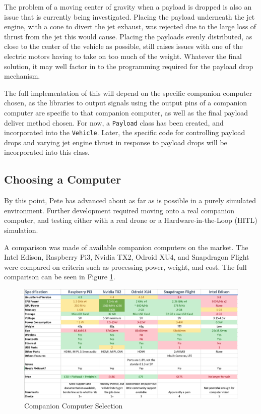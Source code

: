 \documentclass[11pt,twoside]{article}
\begin{document}
The problem of a moving center of gravity when a payload is dropped is also an issue that is currently being investigated. Placing the payload underneath the jet engine, with a cone to divert the jet exhaust, was rejected due to the large loss of thrust from the jet this would cause. Placing the payloads evenly distributed, as close to the center of the vehicle as possible, still raises issues with one of the electric motors having to take on too much of the weight. Whatever the final solution, it may well factor in to the programming required for the payload drop mechanism. \label{payload_delivery}

The full implementation of this will depend on the specific companion computer chosen, as the libraries to output signals using the output pins of a companion computer are specific to that companion computer, as well as the final payload deliver method chosen. For now, a \lstinline|Payload| class has been created, and incorporated into the \lstinline|Vehicle|. Later, the specific code for controlling payload drops and varying jet engine thrust in response to payload drops will be incorporated into this class.

\subsection{Choosing a Computer} \label{cc_selection}
By this point, Pete has advanced about as far as is possible in a purely simulated environment. Further development required moving onto a real companion computer, and testing either with a real drone or a Hardware-in-the-Loop (HITL) simulation.

A comparison was made of available companion computers on the market. The Intel Edison, Raspberry Pi3, Nvidia TX2, Odroid XU4, and Snapdragon Flight were compared on criteria such as processing power, weight, and cost. The full comparison can be seen in Figure \ref{fig:cc_selection}.

\begin{figure}[h]
    \includegraphics[width=\linewidth]{companion_computer_comparison}
    \caption{Companion Computer Selection} \label{fig:cc_selection}
\end{figure}
\end{document}

